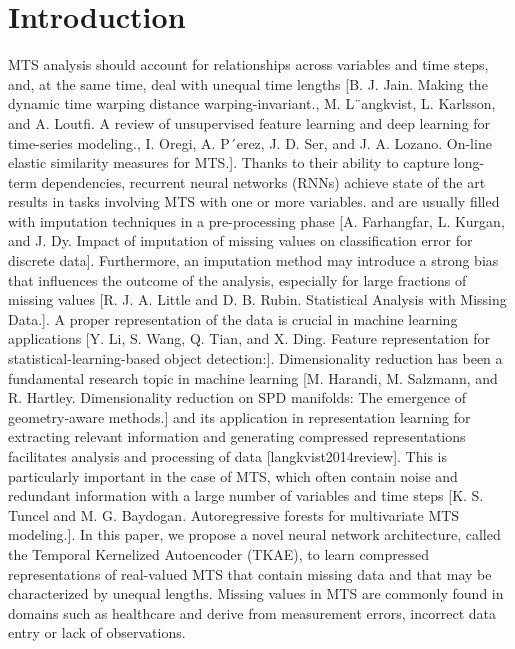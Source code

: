 
\section{Introduction}
\iffalse
MTS analysis should account for relationships across variables and time steps, and, at the same time, deal with unequal time lengths [B. J. Jain. Making the dynamic time warping distance warping-invariant., M. L¨angkvist, L. Karlsson, and A. Loutﬁ. A review of unsupervised feature learning and deep learning for time-series modeling., I. Oregi, A. P´erez, J. D. Ser, and J. A. Lozano. On-line elastic similarity measures for MTS.]. 
Thanks to their ability to capture long-term dependencies, recurrent neural networks (RNNs) achieve state of the art results in tasks involving MTS with one or more variables.
and are usually ﬁlled with imputation techniques in a pre-processing phase [A. Farhangfar, L. Kurgan, and J. Dy. Impact of imputation of missing values on classiﬁcation error for discrete data]. Furthermore, an imputation method may introduce a strong bias that inﬂuences the outcome of the analysis, especially for large fractions of missing values [R. J. A. Little and D. B. Rubin. Statistical Analysis with Missing Data.].
A proper representation of the data is crucial in machine learning applications [Y. Li, S. Wang, Q. Tian, and X. Ding. Feature representation for statistical-learning-based object detection:].
Dimensionality reduction has been a fundamental research topic in machine learning [M. Harandi, M. Salzmann, and R. Hartley. Dimensionality reduction on SPD manifolds: The emergence of geometry-aware methods.] and its application in representation learning for extracting relevant information and generating compressed representations facilitates analysis and processing of data [langkvist2014review]. This is particularly important in the case of MTS, which often contain noise and redundant information with a large number of variables and time steps [K. S. Tuncel and M. G. Baydogan. Autoregressive forests for multivariate MTS modeling.].
In this paper, we propose a novel neural network architecture, called the Temporal Kernelized Autoencoder (TKAE), to learn compressed representations of real-valued MTS that contain missing data and that may be characterized by unequal lengths.
Missing values in MTS are commonly found in domains such as healthcare and derive from measurement errors, incorrect data entry or lack of observations.

